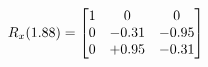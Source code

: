 \documentclass[preview]{standalone}
\begin{document}
\begin{align*}
\special{dvisvgm:raw <g id='unique000'>}R_{x}(1.88) = \begin{bmatrix}1 & 0 & 0 \\0 & -0.31 & -0.95 \\0 & +0.95 & -0.31\end{bmatrix}\special{dvisvgm:raw </g>}
\end{align*}
\end{document}
